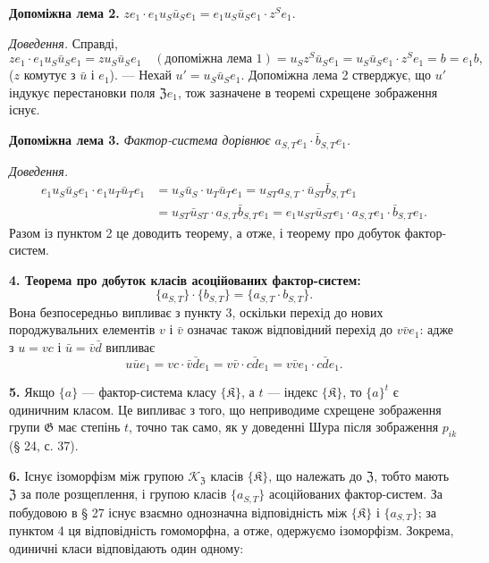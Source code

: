 \documentclass[11pt]{article}
\begin{document}
\noindent\textbf{Допоміжна лема 2.} \(ze_1\cdot e_1u_S\bar u_Se_1=e_1u_S\bar u_Se_1\cdot z^Se_1\).

\noindent\emph{Доведення.} Справді,
\[
ze_1\cdot e_1u_S\bar u_Se_1
=zu_S\bar u_Se_1\quad(\text{допоміжна лема 1})
=u_Sz^S\bar u_Se_1
=u_S\bar u_Se_1\cdot z^Se_1
=b=e_1b,
\]
(\(z\) комутує з \(\bar u\) і \(e_1\)). --- Нехай \(u'=u_S\bar u_Se_1\). Допоміжна лема 2 стверджує, що \(u'\) індукує перестановки поля \(\mathfrak Ze_1\), тож зазначене в теоремі схрещене зображення існує.

\noindent\textbf{Допоміжна лема 3.} \emph{Фактор-система дорівнює \(a_{S,T}e_1\cdot\bar b_{S,T}e_1\).}

\noindent\emph{Доведення.}
\[
\begin{aligned}
e_1u_S\bar u_Se_1\cdot e_1u_T\bar u_Te_1
&=u_S\bar u_S\cdot u_T\bar u_Te_1
 =u_{ST}a_{S,T}\cdot\bar u_{ST}\bar b_{S,T}e_1\\
&=u_{ST}\bar u_{ST}\cdot a_{S,T}\bar b_{S,T}e_1
 =e_1u_{ST}\bar u_{ST}e_1\cdot a_{S,T}e_1\cdot\bar b_{S,T}e_1.
\end{aligned}
\]
Разом із пунктом 2 це доводить теорему, а отже, і теорему про добуток фактор-систем.

\noindent\textbf{4. Теорема про добуток класів асоційованих фактор-систем:}
\[
\{a_{S,T}\}\cdot\{b_{S,T}\}=\{a_{S,T}\cdot b_{S,T}\}.
\]
Вона безпосередньо випливає з пункту 3, оскільки перехід до нових породжувальних елементів \(v\) і \(\bar v\) означає також відповідний перехід до \(v\bar ve_1\): адже з \(u=vc\) і \(\bar u=\bar v\bar d\) випливає
\[
u\bar ue_1=vc\cdot\bar v\bar de_1=v\bar v\cdot c\bar de_1=v\bar ve_1\cdot c\bar de_1.
\]

\noindent\textbf{5.} Якщо \(\{a\}\) --- фактор-система класу \(\{\mathfrak K\}\), а \(t\) --- індекс \(\{\mathfrak K\}\), то \(\{a\}^t\) є одиничним класом. Це випливає з того, що неприводиме схрещене зображення групи \(\mathfrak G\) має степінь \(t\), точно так само, як у доведенні Шура після зображення \(p_{ik}\) (§ 24, с. 37).

\noindent\textbf{6.} Існує ізоморфізм між групою \(\mathscr K_{\mathfrak Z}\) класів \(\{\mathfrak K\}\), що належать до \(\mathfrak Z\), тобто мають \(\mathfrak Z\) за поле розщеплення, і групою класів \(\{a_{S,T}\}\) асоційованих фактор-систем. За побудовою в § 27 існує взаємно однозначна відповідність між \(\{\mathfrak K\}\) і \(\{a_{S,T}\}\); за пунктом 4 ця відповідність гомоморфна, а отже, одержуємо ізоморфізм. Зокрема, одиничні класи відповідають один одному:
\end{document}
